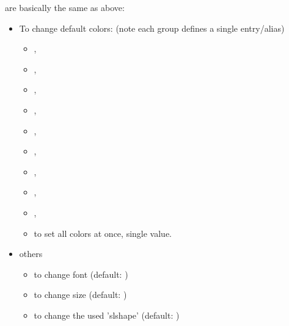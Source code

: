 \documentclass{article}
\begin{document}
\begin{codedescribe}[code]{\setcodefmt}
\begin{codesyntax} %
\end{codesyntax}
 are basically the same as above:
\begin{itemize}[noitemsep]
  \item To change default colors: (note each group defines a single entry/alias)
 \begin{itemize}[noitemsep]
\item {} ,
\item {} ,
\item {} ,
\item {} ,
\item {} ,
\item {} ,
\item {} ,
\item {} ,
\item {} ,
\item {} to set all colors at once, single value.
  \end{itemize}
\item others
  \begin{itemize}
    \item {} to change font (default: \tsobj{\ttfamily})
    \item {} to change size (default: \tsobj{\small})
    \item {} to change the used 'slshape' (default: \tsobj{\slshape})
  \end{itemize}
\end{itemize}

\end{codedescribe}
\end{document}
